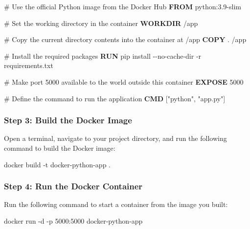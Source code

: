 \documentclass[
  letterpaper,
  DIV=11,
  numbers=noendperiod]{scrreprt}
\newenvironment{Shaded}{\begin{snugshade}}{\end{snugshade}}
\newcommand{\AttributeTok}[1]{\textcolor[rgb]{0.40,0.45,0.13}{#1}}
\newcommand{\CommentTok}[1]{\textcolor[rgb]{0.37,0.37,0.37}{#1}}
\newcommand{\ExtensionTok}[1]{\textcolor[rgb]{0.00,0.23,0.31}{#1}}
\newcommand{\KeywordTok}[1]{\textcolor[rgb]{0.00,0.23,0.31}{\textbf{#1}}}
\newcommand{\NormalTok}[1]{\textcolor[rgb]{0.00,0.23,0.31}{#1}}
\newcommand{\StringTok}[1]{\textcolor[rgb]{0.13,0.47,0.30}{#1}}
\begin{document}
\begin{Shaded}
\begin{Highlighting}[]
\CommentTok{\# Use the official Python image from the Docker Hub}
\KeywordTok{FROM}\NormalTok{ python:3.9{-}slim}

\CommentTok{\# Set the working directory in the container}
\KeywordTok{WORKDIR}\NormalTok{ /app}

\CommentTok{\# Copy the current directory contents into the container at /app}
\KeywordTok{COPY}\NormalTok{ . /app}

\CommentTok{\# Install the required packages}
\KeywordTok{RUN} \ExtensionTok{pip}\NormalTok{ install }\AttributeTok{{-}{-}no{-}cache{-}dir} \AttributeTok{{-}r}\NormalTok{ requirements.txt}

\CommentTok{\# Make port 5000 available to the world outside this container}
\KeywordTok{EXPOSE}\NormalTok{ 5000}

\CommentTok{\# Define the command to run the application}
\KeywordTok{CMD}\NormalTok{ [}\StringTok{"python"}\NormalTok{, }\StringTok{"app.py"}\NormalTok{]}
\end{Highlighting}
\end{Shaded}

\subsubsection{Step 3: Build the Docker
Image}\label{step-3-build-the-docker-image-1}

Open a terminal, navigate to your project directory, and run the
following command to build the Docker image:

\begin{Shaded}
\begin{Highlighting}[]
\ExtensionTok{docker}\NormalTok{ build }\AttributeTok{{-}t}\NormalTok{ docker{-}python{-}app .}
\end{Highlighting}
\end{Shaded}

\subsubsection{Step 4: Run the Docker
Container}\label{step-4-run-the-docker-container-1}

Run the following command to start a container from the image you built:

\begin{Shaded}
\begin{Highlighting}[]
\ExtensionTok{docker}\NormalTok{ run }\AttributeTok{{-}d} \AttributeTok{{-}p}\NormalTok{ 5000:5000 docker{-}python{-}app}
\end{Highlighting}
\end{Shaded}
\end{document}
